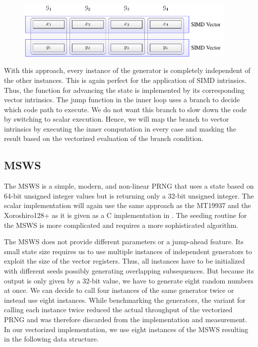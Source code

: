 \documentclass{stdlocal}
\begin{document}

    \begin{figure}
      \center
      \includegraphics[width=0.95\textwidth]{figures/xrsr128p_vector_layout.pdf}
      \caption[Xoroshiro128+ Vector Layout]{}
      \label{fig:xoroshiro-vector-layout}
    \end{figure}

    With this approach, every instance of the generator is completely independent of the other instances.
    This is again perfect for the application of SIMD intrinsics.
    Thus, the function for advancing the state is implemented by its corresponding vector intrinsics.
    The jump function in the inner loop uses a branch to decide which code path to execute.
    We do not want this branch to slow down the code by switching to scalar execution.
    Hence, we will map the branch to vector intrinsics by executing the inner computation in every case and masking the result based on the vectorized evaluation of the branch condition.


  \subsection{MSWS} %
  \label{sub:middle_square_weyl_generator}
    The MSWS is a simple, modern, and non-linear PRNG that uses a state based on 64-bit unsigned integer values but is returning only a 32-bit unsigned integer.
    The scalar implementation will again use the same approach as the MT19937 and the Xoroshiro128+ as it is given as a C implementation in \textcite{widynski2019}.
    The seeding routine for the MSWS is more complicated and requires a more sophisticated algorithm.

    The MSWS does not provide different parameters or a jump-ahead feature.
    Its small state size requires us to use multiple instances of independent generators to exploit the size of the vector registers.
    Thus, all instances have to be initialized with different seeds possibly generating overlapping subsequences.
    But because its output is only given by a 32-bit value, we have to generate eight random numbers at once.
    We can decide to call four instances of the same generator twice or instead use eight instances.
    While benchmarking the generators, the variant for calling each instance twice reduced the actual throughput of the vectorized PRNG and was therefore discarded from the implementation and measurement.
    In our vectorized implementation, we use eight instances of the MSWS resulting in the following data structure.
\end{document}

